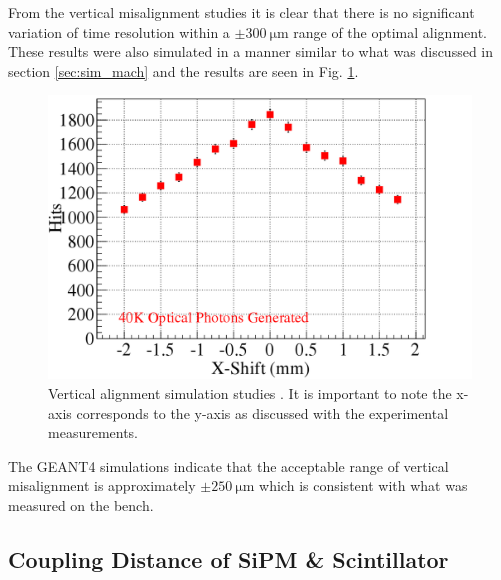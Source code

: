 From the vertical misalignment studies it is clear that there is no significant variation of time resolution within a $\pm 300\ \mathrm{\mu m}$ range of the optimal alignment.  These results were also simulated in a manner similar to what was discussed in section \ref{sec:sim_mach} and the results are seen in Fig. \ref{fig:vertical_sim}.
	\begin{figure}[!htb]
		\centering
		\includegraphics[width=1.0\columnwidth]{misalignment/figs/vertical_sim}
		\caption{Vertical alignment simulation studies \cite{puneet_sim_talk}.  It is important to note the x-axis corresponds to the y-axis as discussed with the experimental measurements.}
		\label{fig:vertical_sim}
	\end{figure}
The GEANT4 simulations indicate that the acceptable range of vertical misalignment is approximately $\pm 250\ \mathrm{\mu m}$ \cite{puneet_sim_talk} which is consistent with what was measured on the bench.

\subsection{Coupling Distance of SiPM \& Scintillator}

